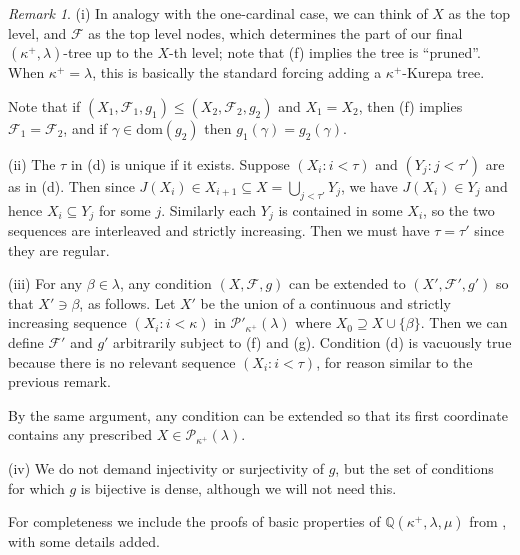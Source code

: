 \documentclass[10pt,reqno]{amsart}
\theoremstyle{plain}
\theoremstyle{definition}
\theoremstyle{remark}
\newtheorem{remark}[theorem]{Remark}
\begin{document}
\begin{remark}
\label{KH_Q_remark}
(i) In analogy with the one-cardinal case, we can think of $X$ as the top level, and $\mathcal{F}$ as the top level nodes, which determines the part of our final $(\kappa^+,\lambda)$-tree up to the $X$-th level; note that (f) implies the tree is ``pruned''. When $\kappa^+=\lambda$, this is basically the standard forcing adding a $\kappa^+$-Kurepa tree.

Note that if $(X_1,\mathcal{F}_1,g_1)\leq(X_2,\mathcal{F}_2,g_2)$ and $X_1=X_2$, then (f) implies $\mathcal{F}_1=\mathcal{F}_2$, and if $\gamma\in\mathrm{dom}(g_2)$ then $g_1(\gamma)=g_2(\gamma)$.

(ii) The $\tau$ in (d) is unique if it exists. Suppose $(X_i:i<\tau)$ and $(Y_j:j<\tau')$ are as in (d). Then since $J(X_i)\in X_{i+1}\subseteq X=\bigcup_{j<\tau'}Y_j$, we have $J(X_i)\in Y_j$ and hence $X_i\subseteq Y_j$ for some $j$. Similarly each $Y_j$ is contained in some $X_i$, so the two sequences are interleaved and strictly increasing. Then we must have $\tau=\tau'$ since they are regular.

(iii) For any $\beta\in\lambda$, any condition $(X,\mathcal{F},g)$ can be extended to $(X',\mathcal{F}',g')$ so that $X'\ni\beta$, as follows. Let $X'$ be the union of a continuous and strictly increasing sequence $(X_i:i<\kappa)$ in $\mathcal{P}'_{\kappa^+}(\lambda)$ where $X_0\supseteq X\cup\{\beta\}$. Then we can define $\mathcal{F}'$ and $g'$ arbitrarily subject to (f) and (g). Condition (d) is vacuously true because there is no relevant sequence $(X_i:i<\tau)$, for reason similar to the previous remark.

By the same argument, any condition can be extended so that its first coordinate contains any prescribed $X\in\mathcal{P}_{\kappa^+}(\lambda)$.

(iv) We do not demand injectivity or surjectivity of $g$, but the set of conditions for which $g$ is bijective is dense, although we will not need this.

\end{remark}





For completeness we include the proofs of basic properties of $\mathbb{Q}(\kappa^+,\lambda,\mu)$ from \cite{friedman-golshani2012independence}, with some details added.
\end{document}
